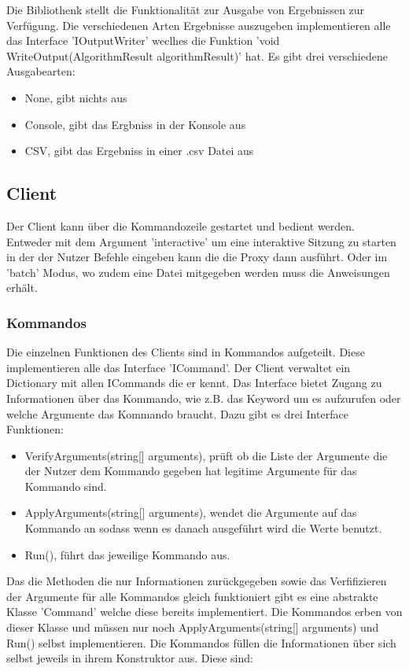 Die Bibliothenk stellt die Funktionalität zur Ausgabe von Ergebnissen zur Verfügung. Die verschiedenen Arten Ergebnisse auszugeben implementieren alle
das Interface 'IOutputWriter' weclhes die Funktion 'void WriteOutput(AlgorithmResult algorithmResult)' hat. Es gibt drei verschiedene Ausgabearten:

\begin{itemize}
  \item None, gibt nichts aus
  \item Console, gibt das Ergbniss in der Konsole aus
  \item CSV, gibt das Ergebniss in einer .csv Datei aus
\end{itemize}


\subsection{Client}

Der Client kann über die Kommandozeile gestartet und bedient werden. Entweder mit dem Argument 'interactive' um eine interaktive Sitzung zu starten
in der der Nutzer Befehle eingeben kann die die Proxy dann ausführt. Oder im 'batch' Modus, wo zudem eine Datei mitgegeben werden muss die Anweisungen erhält.

\subsubsection{Kommandos}

Die einzelnen Funktionen des Clients sind in Kommandos aufgeteilt.
Diese implementieren alle das Interface 'ICommand'. Der Client verwaltet ein Dictionary mit allen ICommands die er kennt.
Das Interface bietet Zugang zu Informationen über das Kommando, wie z.B. das Keyword um es aufzurufen oder welche Argumente das Kommando braucht.
Dazu gibt es drei Interface Funktionen:

\begin{itemize}
  \item VerifyArguments(string[] arguments), prüft ob die Liste der Argumente die der Nutzer dem Kommando gegeben hat legitime Argumente für das Kommando sind.
  \item ApplyArguments(string[] arguments), wendet die Argumente auf das Kommando an sodass wenn es danach ausgeführt wird die Werte benutzt.
  \item Run(), führt das jeweilige Kommando aus.
\end{itemize}

Das die Methoden die nur Informationen zurückgegeben sowie das Verfifizieren der Argumente für alle Kommandos gleich funktioniert gibt es eine abstrakte Klasse
'Command' welche diese bereits implementiert. Die Kommandos erben von dieser Klasse und müssen nur noch ApplyArguments(string[] arguments) und Run() selbst implementieren.
Die Kommandos füllen die Informationen über sich selbst jeweils in ihrem Konstruktor aus. Diese sind:

